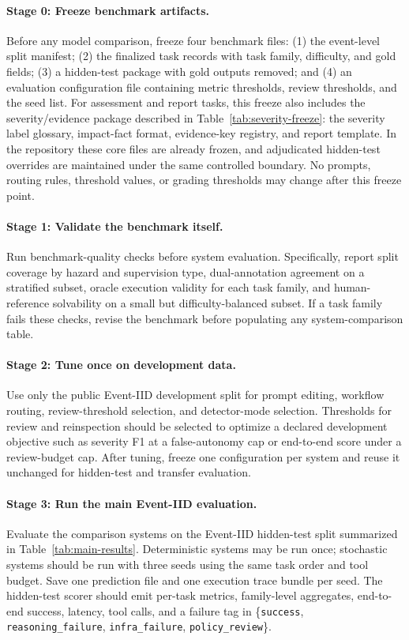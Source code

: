 \documentclass{article}
\begin{document}
\paragraph{Stage 0: Freeze benchmark artifacts.}
Before any model comparison, freeze four benchmark files: (1) the event-level split manifest; (2) the finalized task records with task family, difficulty, and gold fields; (3) a hidden-test package with gold outputs removed; and (4) an evaluation configuration file containing metric thresholds, review thresholds, and the seed list. For assessment and report tasks, this freeze also includes the severity/evidence package described in Table~\ref{tab:severity-freeze}: the severity label glossary, impact-fact format, evidence-key registry, and report template. In the repository these core files are already frozen, and adjudicated hidden-test overrides are maintained under the same controlled boundary. No prompts, routing rules, threshold values, or grading thresholds may change after this freeze point.

\paragraph{Stage 1: Validate the benchmark itself.}
Run benchmark-quality checks before system evaluation. Specifically, report split coverage by hazard and supervision type, dual-annotation agreement on a stratified subset, oracle execution validity for each task family, and human-reference solvability on a small but difficulty-balanced subset. If a task family fails these checks, revise the benchmark before populating any system-comparison table.

\paragraph{Stage 2: Tune once on development data.}
Use only the public Event-IID development split for prompt editing, workflow routing, review-threshold selection, and detector-mode selection. Thresholds for review and reinspection should be selected to optimize a declared development objective such as severity F1 at a false-autonomy cap or end-to-end score under a review-budget cap. After tuning, freeze one configuration per system and reuse it unchanged for hidden-test and transfer evaluation.

\paragraph{Stage 3: Run the main Event-IID evaluation.}
Evaluate the comparison systems on the Event-IID hidden-test split summarized in Table~\ref{tab:main-results}. Deterministic systems may be run once; stochastic systems should be run with three seeds using the same task order and tool budget. Save one prediction file and one execution trace bundle per seed. The hidden-test scorer should emit per-task metrics, family-level aggregates, end-to-end success, latency, tool calls, and a failure tag in \{\texttt{success}, \texttt{reasoning\_failure}, \texttt{infra\_failure}, \texttt{policy\_review}\}.
\end{document}
